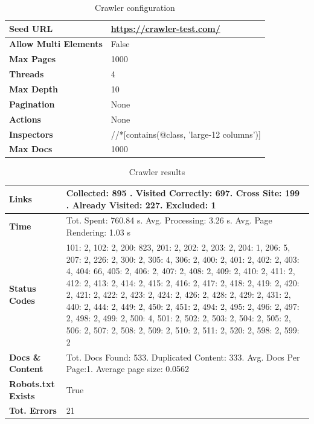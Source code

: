 {\begin{table}[ht] 
{\footnotesize
\begin{tabular}{ P{3cm} ||P{10.1cm}  }      %
 \hline \hline
\textbf{Seed URL} & \href{https://crawler-test.com/}{https://crawler-test.com/}\T\B 
\\ 
\hline
\textbf{Allow Multi Elements} & False \T\B 
\\ 
\hline
\textbf{Max Pages} & 1000\T\B 
\\ 
\hline
\textbf{Threads} & 4\T\B 
\\ 
\hline
\textbf{Max Depth} & 10\T\B 
\\ 
\hline
\textbf{Pagination} & None\T\B 
\\ 
\hline
\textbf{Actions} & None\T\B 
\\ 
\hline
\textbf{Inspectors} & //*[contains(@class, 'large-12 columns')]\T\B 
\\ 
\hline
\textbf{Max Docs} & 1000\T\B 
\\ 
\hline \hline
    \end{tabular}
}
  \captionsetup{justification=centering,margin=2cm}
  \caption{Crawler configuration}
\end{table}



\begin{table}[ht] 
{\footnotesize
\begin{tabular}{ P{3cm} ||P{10.1cm}  }      %
 \hline \hline
\textbf{Links} & Collected: 895 . Visited Correctly: 697. Cross Site: 199 . Already Visited: 227. Excluded: 1\T\B 
\\ 
\hline
\textbf{Time} & Tot. Spent: 760.84 s. Avg. Processing: 3.26 s. Avg. Page Rendering: 1.03 s\T\B 
\\
\hline
\textbf{Status Codes} &     101: 2, 102: 2, 200: 823, 201: 2, 202: 2, 203: 2, 204: 1, 206: 5, 207: 2, 226: 2, 300: 2, 305: 4, 306: 2, 400: 2, 401: 2, 402: 2, 403: 4, 404: 66, 405: 2, 406: 2, 407: 2, 408: 2, 409: 2, 410: 2, 411: 2, 412: 2, 413: 2, 414: 2, 415: 2, 416: 2, 417: 2, 418: 2, 419: 2, 420: 2, 421: 2, 422: 2, 423: 2, 424: 2, 426: 2, 428: 2, 429: 2, 431: 2, 440: 2, 444: 2, 449: 2, 450: 2, 451: 2, 494: 2, 495: 2, 496: 2, 497: 2, 498: 2, 499: 2, 500: 4, 501: 2, 502: 2, 503: 2, 504: 2, 505: 2, 506: 2, 507: 2, 508: 2, 509: 2, 510: 2, 511: 2, 520: 2, 598: 2, 599: 2\T\B 
\\ 
\hline
\textbf{Docs \& Content} & Tot. Docs Found: 533. Duplicated Content: 333. Avg. Docs Per Page:1. Average page size: 0.0562\T\B 
\\ 
\hline
\textbf{Robots.txt Exists} & True\T\B 
\\ 
\hline
\textbf{Tot. Errors} & 21\T\B 
\\ 
\hline \hline
    \end{tabular}
}
  \captionsetup{justification=centering,margin=2cm}
  \caption{Crawler results}
\end{table}


}
